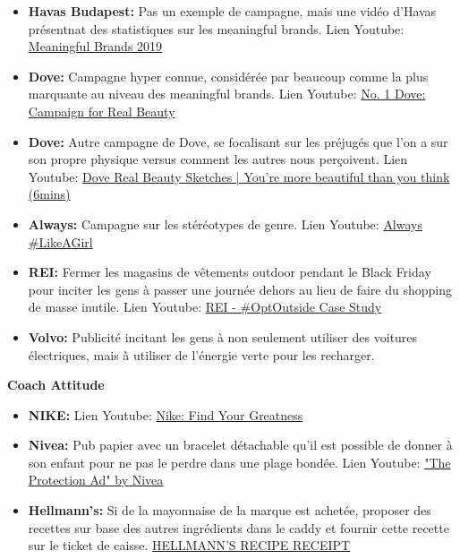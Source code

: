 \begin{itemize}
    \item \textbf{Havas Budapest:} Pas un exemple de campagne, mais une vidéo d'Havas présentnat des statistiques sur les meaningful brands. Lien Youtube: \href{https://www.youtube.com/watch?v=w2m9NpQD9mE}{Meaningful Brands 2019}
    \item \textbf{Dove:} Campagne hyper connue, considérée par beaucoup comme la plus marquante au niveau des meaningful brands. Lien Youtube: \href{https://www.youtube.com/watch?v=wpM499XhMJQ}{No. 1 Dove: Campaign for Real Beauty}
    \item \textbf{Dove:} Autre campagne de Dove, se focalisant sur les préjugés que l'on a sur son propre physique versus comment les autres nous perçoivent. Lien Youtube: \href{https://www.youtube.com/watch?v=litXW91UauE}{Dove Real Beauty Sketches | You're more beautiful than you think (6mins)}
    \item \textbf{Always:} Campagne sur les stéréotypes de genre. Lien Youtube: \href{https://www.youtube.com/watch?v=XjJQBjWYDTs}{Always \#LikeAGirl}
    \item \textbf{REI:} Fermer les magasins de vêtements outdoor pendant le Black Friday pour inciter les gens à passer une journée dehors au lieu de faire du shopping de masse inutile. Lien Youtube: \href{https://www.youtube.com/watch?v=lMsxrJeJ8lU}{REI - \#OptOutside Case Study}
    \item \textbf{Volvo:} Publicité incitant les gens à non seulement utiliser des voitures électriques, mais à utiliser de l'énergie verte pour les recharger.\\
\end{itemize}


\textbf{Coach Attitude}

\begin{itemize}
    \item \textbf{NIKE:} Lien Youtube: \href{https://www.youtube.com/watch?v=WYP9AGtLvRg}{Nike: Find Your Greatness}
    \item \textbf{Nivea:} Pub papier avec un bracelet détachable qu'il est possible de donner à son enfant pour ne pas le perdre dans une plage bondée. Lien Youtube: \href{https://www.youtube.com/watch?v=nZ532wkhHYs}{"The Protection Ad" by Nivea}
    \item \textbf{Hellmann's:} Si de la mayonnaise de la marque est achetée, proposer des recettes sur base des autres ingrédients dans le caddy et fournir cette recette sur le ticket de caisse. \href{https://www.youtube.com/watch?v=h3aCVrcnFOQ}{HELLMANN'S RECIPE RECEIPT}\\
\end{itemize}

